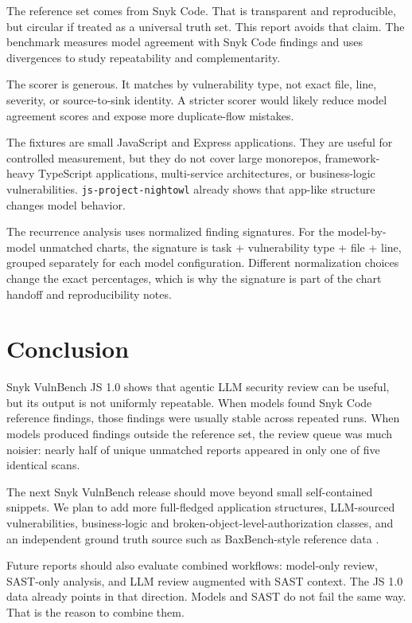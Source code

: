 \documentclass[11pt]{article}
\begin{document}
The reference set comes from Snyk Code. That is transparent and reproducible, but circular if treated as a universal truth set. This report avoids that claim. The benchmark measures model agreement with Snyk Code findings and uses divergences to study repeatability and complementarity.

The scorer is generous. It matches by vulnerability type, not exact file, line, severity, or source-to-sink identity. A stricter scorer would likely reduce model agreement scores and expose more duplicate-flow mistakes.

The fixtures are small JavaScript and Express applications. They are useful for controlled measurement, but they do not cover large monorepos, framework-heavy TypeScript applications, multi-service architectures, or business-logic vulnerabilities. \texttt{js-project-nightowl} already shows that app-like structure changes model behavior.

The recurrence analysis uses normalized finding signatures. For the model-by-model unmatched charts, the signature is task + vulnerability type + file + line, grouped separately for each model configuration. Different normalization choices change the exact percentages, which is why the signature is part of the chart handoff and reproducibility notes.

\section{Conclusion}

Snyk VulnBench JS 1.0 shows that agentic LLM security review can be useful, but its output is not uniformly repeatable. When models found Snyk Code reference findings, those findings were usually stable across repeated runs. When models produced findings outside the reference set, the review queue was much noisier: nearly half of unique unmatched reports appeared in only one of five identical scans.

The next Snyk VulnBench release should move beyond small self-contained snippets. We plan to add more full-fledged application structures, LLM-sourced vulnerabilities, business-logic and broken-object-level-authorization classes, and an independent ground truth source such as BaxBench-style reference data \cite{vero2025baxbench}.

Future reports should also evaluate combined workflows: model-only review, SAST-only analysis, and LLM review augmented with SAST context. The JS 1.0 data already points in that direction. Models and SAST do not fail the same way. That is the reason to combine them.



\end{document}
